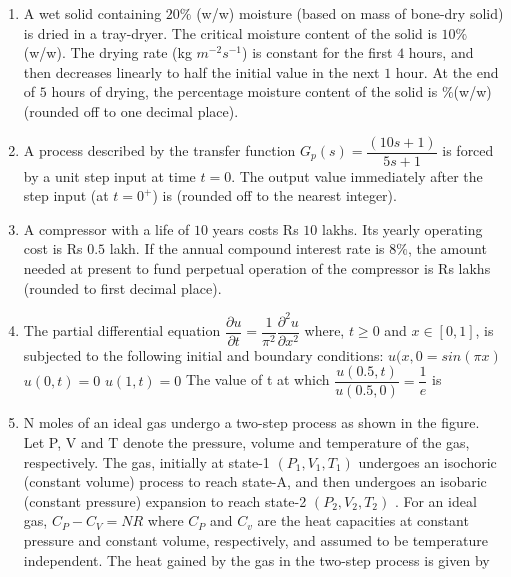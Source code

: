 \documentclass[journal]{IEEEtran}
\numberwithin{equation}{enumi}
\numberwithin{figure}{enumi}
\begin{document}
\begin{enumerate}[start=1, label={Q\arabic*.}]
  \vspace{0.2cm}
  \item A wet solid containing $20\%$ (w/w) moisture (based on mass of bone-dry solid) is dried in a tray-dryer. The critical moisture content of the solid is $10\%$ (w/w). The drying rate (kg $m^{-2}s^{-1}$) is constant for the first $4$ hours, and then decreases linearly to half the initial value in the next $1$ hour. At the end of $5$ hours of drying, the percentage moisture content of the solid is \underline{\hspace{1.5cm}} $\%$(w/w) (rounded off to one decimal place).
  \vspace{0.2cm}
 \item A process described by the transfer function $G_p(s)=\dfrac{(10s+1)}{5s+1}$ is forced by a unit step input at time $t=0$. The output value immediately after the step input (at $t=0^{+}$) is \underline{\hspace{1.5cm}} (rounded off to the nearest integer).
 \vspace{0.2cm}
 \item A compressor with a life of $10$ years costs Rs $10$ lakhs. Its yearly operating cost is Rs $0.5$ lakh. If the annual compound interest rate is $8\%$, the amount needed at present to fund perpetual operation of the compressor is Rs 
 \underline{\hspace{1.5cm}}lakhs (rounded to first decimal place).
 \newpage
 \item The partial differential equation $\dfrac{\partial u}{\partial t}=\dfrac{1}{\pi^{2}} \dfrac{\partial^{2} u}{\partial x^{2}}$ where, $t\geq0$ and $x \in [0,1]$, is subjected to the following initial and boundary conditions:\newline
 $u(x,0=sin(\pi x)$ \newline
 $u(0,t)=0$\newline
 $u(1,t)=0$\newline
 The value of t at which $\dfrac{u(0.5,t)}{u(0.5,0)}=\dfrac{1}{e}$ is 
 \begin{enumerate} 
  \end{enumerate}
  \item N moles of an ideal gas undergo a two-step process as shown in the figure. Let P, V and T denote the pressure, volume and temperature of the gas, respectively. The gas, initially at state-1 $(P_{1}, V_{1}, T_{1})$ undergoes an isochoric (constant volume) process to reach state-A, and then undergoes an isobaric (constant pressure) expansion to reach state-2 $(P_{2}, V_{2}, T_{2})$ . For an ideal gas, $C_{P} - C_{V} = NR$ where $C_{P}$ and $C_{v}$ are the heat capacities at constant pressure and constant volume, respectively, and assumed to be temperature independent. The heat gained by the gas in the two-step process is given by

\end{enumerate}
\end{document}
